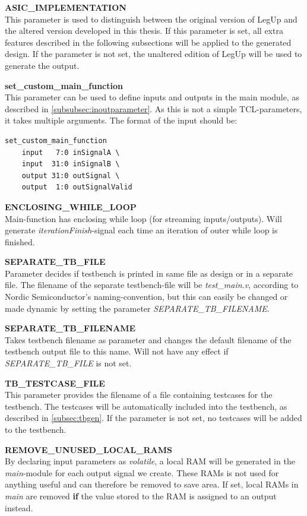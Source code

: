 \begin{description}
\item{\textbf{ASIC\_IMPLEMENTATION}} \hfill \\
This parameter is used to distinguish between the original version of LegUp and the altered version developed in this thesis. If this parameter is set, all extra features described in the following subsections will be applied to the generated design. If the parameter is not set, the unaltered edition of LegUp will be used to generate the output.
\item{\textbf{set\_custom\_main\_function}} \hfill \\
This parameter can be used to define inputs and outputs in the main module, as described in \cref{subsubsec:inoutparameter}. As this is not a simple TCL-parameters, it takes multiple arguments. The format of the input should be:
\begin{verbatim}
set_custom_main_function 
    input   7:0 inSignalA \
    input  31:0 inSignalB \
    output 31:0 outSignal \
    output  1:0 outSignalValid
\end{verbatim}
\item{\textbf{ENCLOSING\_WHILE\_LOOP}} \hfill \\
Main-function has enclosing while loop (for streaming inputs/outputs). Will generate \textit{iterationFinish}-signal each time an iteration of outer while loop is finished.
\item{\textbf{SEPARATE\_TB\_FILE}} \hfill \\
Parameter decides if testbench is printed in same file as design or in a separate file. The filename of the separate testbench-file will be \textit{test\_main.v}, according to Nordic Semiconductor's naming-convention, but this can easily be changed or made dynamic by setting the parameter \textit{SEPARATE\_TB\_FILENAME}.
\item{\textbf{SEPARATE\_TB\_FILENAME}} \hfill \\
Takes testbench filename as parameter and changes the default filename of the testbench output file to this name. Will not have any effect if \textit{SEPARATE\_TB\_FILE} is not set.
\item{\textbf{TB\_TESTCASE\_FILE}} \hfill \\
This parameter provides the filename of a file containing testcases for the testbench. The testcases will be automatically included into the testbench, as described in \cref{subsec:tbgen}. If the parameter is not set, no testcases will be added to the testbench.
\item{\textbf{REMOVE\_UNUSED\_LOCAL\_RAMS}} \hfill \\
By declaring input parameters as \textit{volatile}, a local RAM will be generated in the \textit{main}-module for each output signal we create. These RAMs is not used for anything useful and can therefore be removed to save area. If set, local RAMs in \textit{main} are removed \textbf{if} the value stored to the RAM is assigned to an output instead.
\end{description}

